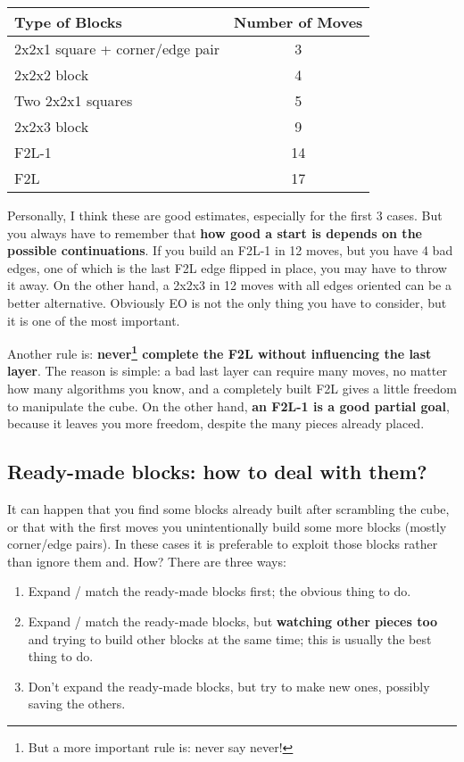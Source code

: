 \documentclass[11pt,a4paper]{book}
\begin{document}
\bigskip
\begin{center}
\begin{tabular}{|l|c|}
\hline
Type of Blocks & Number of Moves\\
\hline
2x2x1 square + corner/edge pair & 3\\
\hline
2x2x2 block & 4\\
\hline
Two 2x2x1 squares & 5\\
\hline
2x2x3 block & 9\\
\hline
F2L-1 & 14\\
\hline
F2L & 17\\
\hline
\end{tabular}
\end{center}

Personally, I think these are good estimates, especially for the first 3 cases. But you always have to remember that \textbf{how good a start is depends on the possible continuations}. If you build an F2L-1 in 12 moves, but you have 4 bad edges, one of which is the last F2L edge flipped in place, you may have to throw it away. On the other hand, a 2x2x3 in 12 moves with all edges oriented can be a better alternative. Obviously EO is not the only thing you have to consider, but it is one of the most important.

Another rule is: \textbf{never\footnote{But a more important rule is: never say never!} complete the F2L without influencing the last layer}. The reason is simple: a bad last layer can require many moves, no matter how many algorithms you know, and a completely built F2L gives a little freedom to manipulate the cube. On the other hand, \textbf{an F2L-1 is a good partial goal}, because it leaves you more freedom, despite the many pieces already placed.

\subsection{Ready-made blocks: how to deal with them?}
\label{ready-made}

It can happen that you find some blocks already built after scrambling the cube, or that with the first moves you unintentionally build some more blocks (mostly corner/edge pairs). In these cases it is preferable to exploit those blocks rather than ignore them and. How? There are three ways:

\begin{enumerate}
\item Expand / match the ready-made blocks first; the obvious thing to do.
\item Expand / match the ready-made blocks, but \textbf{watching other pieces too} and trying to build other blocks at the same time; this is usually the best thing to do.
\item Don't expand the ready-made blocks, but try to make new ones, possibly saving the others.
\end{enumerate}
\end{document}
